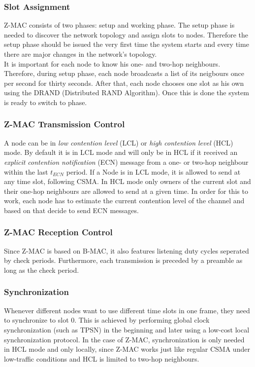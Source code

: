 \subsubsection{Slot Assignment}
Z-MAC consists of two phases: setup and working phase. The setup phase is needed to discover the network topology and assign slots to nodes. Therefore the setup phase should be issued the very first time the system starts and every time there are major changes in the network's topology.\\
It is important for each node to know his one- and two-hop neighbours. Therefore, during setup phase, each node broadcasts a list of its neigbours once per second for thirty seconds. After that, each node chooses one slot as his own using the DRAND (Distributed RAND Algorithm). Once this is done the system is ready to switch to
phase.

\subsubsection{Z-MAC Transmission Control}
A node can be in \textit{low contention level} (LCL) or \textit{high contention level} (HCL) mode. By default it is in LCL mode and will only be in HCL if it received an \textit{explicit contention notification} (ECN) message from a one- or two-hop neighbour within the last $t_{ECN}$ period. If a Node is in LCL mode, it is allowed to send at any time slot, following CSMA. In HCL mode only owners of the current slot and their one-hop neighbours are allowed to send at a given time. In order for this to work, each node has to estimate the current contention level of the channel and based on that decide to send ECN messages.

\subsubsection{Z-MAC Reception Control}
Since Z-MAC is based on B-MAC, it also features listening duty cycles seperated by check periods. Furthermore, each transmission is preceded by a preamble as long as the check period.

\subsubsection{Synchronization}
Whenever different nodes want to use different time slots in one frame, they need to synchronize to slot 0. This is achieved by performing global clock synchronization (such as TPSN) in the beginning and later using a low-cost local synchronization protocol. In the case of Z-MAC, synchronization is only needed in HCL mode and only locally, since Z-MAC works just like regular CSMA under low-traffic conditions and HCL is limited to two-hop neighbours.
